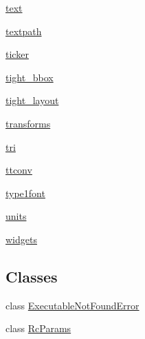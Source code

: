 \begin{DoxyCompactItemize}
 \hyperlink{namespacematplotlib_1_1text}{text}
\item 
 \hyperlink{namespacematplotlib_1_1textpath}{textpath}
\item 
 \hyperlink{namespacematplotlib_1_1ticker}{ticker}
\item 
 \hyperlink{namespacematplotlib_1_1tight__bbox}{tight\+\_\+bbox}
\item 
 \hyperlink{namespacematplotlib_1_1tight__layout}{tight\+\_\+layout}
\item 
 \hyperlink{namespacematplotlib_1_1transforms}{transforms}
\item 
 \hyperlink{namespacematplotlib_1_1tri}{tri}
\item 
 \hyperlink{namespacematplotlib_1_1ttconv}{ttconv}
\item 
 \hyperlink{namespacematplotlib_1_1type1font}{type1font}
\item 
 \hyperlink{namespacematplotlib_1_1units}{units}
\item 
 \hyperlink{namespacematplotlib_1_1widgets}{widgets}
\end{DoxyCompactItemize}
\subsection*{Classes}
\begin{DoxyCompactItemize}
\item 
class \hyperlink{classmatplotlib_1_1ExecutableNotFoundError}{Executable\+Not\+Found\+Error}
\item 
class \hyperlink{classmatplotlib_1_1RcParams}{Rc\+Params}
\end{DoxyCompactItemize}
